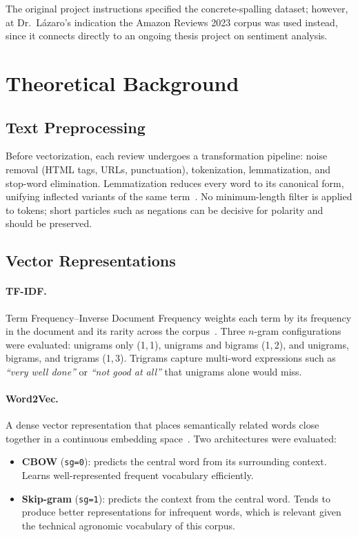 \documentclass[12pt, letterpaper]{article}
\begin{document}
The original project instructions specified the concrete-spalling dataset;
however, at Dr.\ Lázaro's indication the Amazon Reviews 2023 corpus was used
instead, since it connects directly to an ongoing thesis project on sentiment
analysis.

\section{Theoretical Background}

\subsection{Text Preprocessing}

Before vectorization, each review undergoes a transformation pipeline:
noise removal (HTML tags, URLs, punctuation), tokenization, lemmatization, and
stop-word elimination. Lemmatization reduces every word to its canonical form,
unifying inflected variants of the same term~\cite{spacy}. No minimum-length
filter is applied to tokens; short particles such as negations can be
decisive for polarity and should be preserved.

\subsection{Vector Representations}

\paragraph{TF-IDF.}
Term Frequency--Inverse Document Frequency weights each term by its frequency
in the document and its rarity across the corpus~\cite{sklearn}. Three
$n$-gram configurations were evaluated: unigrams only \mbox{(1,\,1)},
unigrams and bigrams \mbox{(1,\,2)}, and unigrams, bigrams, and trigrams
\mbox{(1,\,3)}. Trigrams capture multi-word expressions such as
\textit{``very well done''} or \textit{``not good at all''} that unigrams
alone would miss.

\paragraph{Word2Vec.}
A dense vector representation that places semantically related words close
together in a continuous embedding space~\cite{word2vec}. Two architectures
were evaluated:

\begin{itemize}
  \item \textbf{CBOW} (\texttt{sg=0}): predicts the central word from its
    surrounding context. Learns well-represented frequent vocabulary efficiently.
  \item \textbf{Skip-gram} (\texttt{sg=1}): predicts the context from the
    central word. Tends to produce better representations for infrequent words,
    which is relevant given the technical agronomic vocabulary of this corpus.
\end{itemize}
\end{document}
